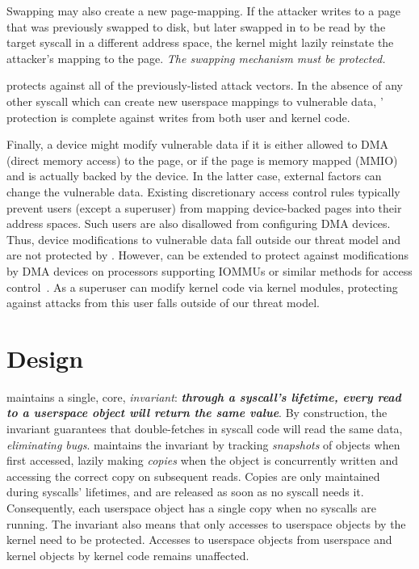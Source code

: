 \documentclass[letterpaper,twocolumn,10pt]{article}
\begin{document}
Swapping may also create a new page-mapping.
If the attacker writes to a page that was previously swapped
to disk, but later swapped in to be read by the target syscall in
a different address space, the kernel might lazily reinstate
the attacker's mapping to the page.
\emph{The swapping mechanism must be protected.}

\midas protects against all of the previously-listed attack vectors.
In the absence of any other syscall which can create new userspace
mappings to vulnerable data, \midas' protection is complete
against writes from both user and kernel code.

Finally, a device might modify vulnerable data if it is either
allowed to DMA (direct memory access) to the page, or if the page is memory 
mapped (MMIO) and is actually backed by the device.
In the latter case, external factors can change the vulnerable
data.
Existing discretionary access control rules typically prevent users
(except a superuser) from mapping device-backed pages into their
address spaces.
Such users are also disallowed from configuring DMA devices.
Thus, device modifications to vulnerable data fall outside
our threat model and are not protected by \midas.
However, \midas can be extended to protect against modifications by DMA devices
on processors supporting IOMMUs or similar methods for
access control~\cite{olsonbordercontrol}.
As a superuser can modify kernel code via kernel modules, protecting against 
attacks from this user falls outside of our threat model.


\section{\midas Design}
\label{sec:design}

\midas maintains a single, core, \emph{invariant}:
\textbf{\emph{through a syscall's lifetime, every read to a userspace object
will return the same value}}.
By construction, the invariant guarantees that double-fetches in syscall
code will read the same data, \emph{eliminating \tocttou bugs}.
\midas maintains the invariant by tracking \emph{snapshots} of objects
when first accessed, lazily making \emph{copies} when the object is concurrently
written and accessing the correct copy on subsequent reads.
Copies are only maintained during syscalls' lifetimes, and are released as
soon as no syscall needs it.
Consequently, each userspace object has a single copy when no syscalls are
running.
The invariant also means that only accesses to userspace objects by the kernel
need to be protected.
Accesses to userspace objects from userspace and kernel objects by kernel
code remains unaffected.
\end{document}
